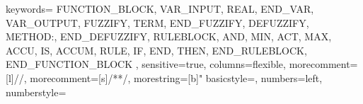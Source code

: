 \documentclass{amsart}
\begin{document}
\newcommand{\NN}{\mathbb{N}}              %
\newcommand{\QQ}{\mathbb{Q}}              %
\newcommand{\RR}{\mathbb{R}}              %
\newcommand{\ZZ}{\mathbb{Z}}              %
\newcommand{\setcomp}[1]{\overline{#1}}   %
\newcommand{\negate}{{\sim}}              %
\newcommand{\xor}{\oplus}                 %
\renewcommand{\implies}{\Rightarrow}      %
\renewcommand{\iff}{\Leftrightarrow}      %
\newcommand{\powerset}{\raisebox{.15\baselineskip}{\Large\ensuremath{\wp}}}



\usepackage[bottom]{footmisc}

\renewcommand{\lstlistingname}{Programa}%
\renewcommand{\lstlistlistingname}{Lista de \lstlistingname s}%
{
  keywords={
    FUNCTION_BLOCK,
    VAR_INPUT,
    REAL,
    END_VAR,
    VAR_OUTPUT,
    FUZZIFY,
    TERM,
    END_FUZZIFY,
    DEFUZZIFY,
    METHOD:,
    END_DEFUZZIFY,
    RULEBLOCK,
    AND, MIN, ACT, MAX, ACCU, IS,
    ACCUM,
    RULE,
    IF, END,
    THEN,
    END_RULEBLOCK,
    END_FUNCTION_BLOCK
  },
  sensitive=true, %
  columns=flexible,
  morecomment=[l]{//}, %
  morecomment=[s]{/*}{*/}, %
  morestring=[b]" %
  basicstyle=\scriptsize,
    numbers=left, %
  numberstyle=\tiny\ttfamily %
}
\end{document}
